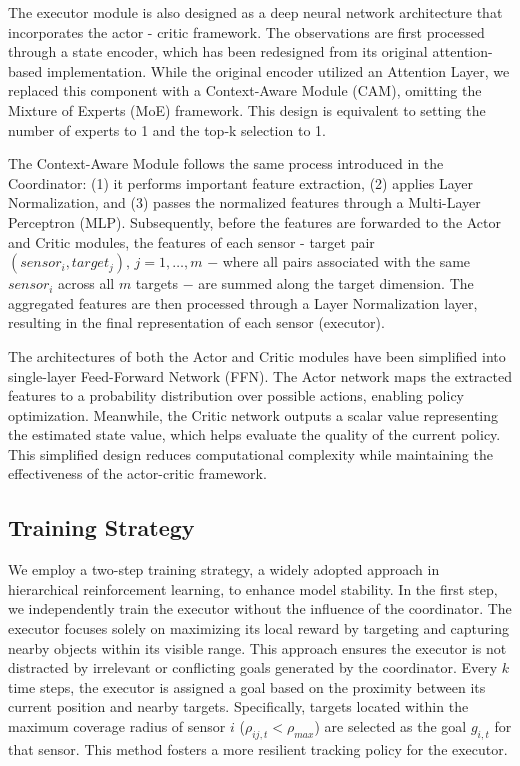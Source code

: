 \documentclass[preprint,12pt]{elsarticle}
\begin{document}
%     

The executor module is also designed as a deep neural network architecture that incorporates the actor - critic framework. The observations are first processed through a state encoder, which has been redesigned from its original attention-based implementation. While the original encoder utilized an Attention Layer, we replaced this component with a Context-Aware Module (CAM), omitting the Mixture of Experts (MoE) framework. This design is equivalent to setting the number of experts to 1 and the top-k selection to 1.

The Context-Aware Module follows the same process introduced in the Coordinator: (1) it performs important feature extraction, (2) applies Layer Normalization, and (3) passes the normalized features through a Multi-Layer Perceptron (MLP). Subsequently, before the features are forwarded to the Actor and Critic modules, the features of each sensor - target pair $ (sensor_i, target_j), \, j = 1, \dots, m $
$-$ where all pairs associated with the same $sensor_i$ across all $m$ targets $-$ are summed along the target dimension. The aggregated features are then processed through a Layer Normalization layer, resulting in the final representation of each sensor (executor).

The architectures of both the Actor and Critic modules have been simplified into single-layer Feed-Forward Network (FFN). The Actor network maps the extracted features to a probability distribution over possible actions, enabling policy optimization. Meanwhile, the Critic network outputs a scalar value representing the estimated state value, which helps evaluate the quality of the current policy. This simplified design reduces computational complexity while maintaining the effectiveness of the actor-critic framework.

\subsection{Training Strategy}
We employ a two-step training strategy, a widely adopted approach in hierarchical reinforcement learning, to enhance model stability. In the first step, we independently train the executor without the influence of the coordinator. The executor focuses solely on maximizing its local reward by targeting and capturing nearby objects within its visible range. This approach ensures the executor is not distracted by irrelevant or conflicting goals generated by the coordinator. Every $k$ time steps, the executor is assigned a goal based on the proximity between its current position and nearby targets. Specifically, targets located within the maximum coverage radius of sensor $i$ ($\rho_{ij,t}<\rho_{max}$) are selected as the goal $g_{i,t}$ for that sensor. This method fosters a more resilient tracking policy for the executor.
\end{document}
